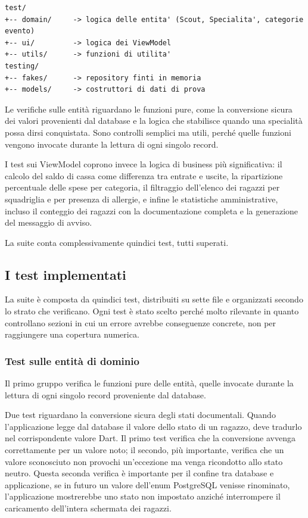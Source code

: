 \documentclass[11pt]{article}
\numberwithin{figure}{section}
\begin{document}
\begin{verbatim}
test/
+-- domain/     -> logica delle entita' (Scout, Specialita', categorie evento)
+-- ui/         -> logica dei ViewModel
+-- utils/      -> funzioni di utilita'
testing/
+-- fakes/      -> repository finti in memoria
+-- models/     -> costruttori di dati di prova
\end{verbatim}

Le verifiche sulle entità riguardano le funzioni pure, come la conversione sicura dei valori provenienti dal database e la logica che stabilisce quando una specialità possa dirsi conquistata. Sono controlli semplici ma utili, perché quelle funzioni vengono invocate durante la lettura di ogni singolo record.

I test sui ViewModel coprono invece la logica di business più significativa: il calcolo del saldo di cassa come differenza tra entrate e uscite, la ripartizione percentuale delle spese per categoria, il filtraggio dell'elenco dei ragazzi per squadriglia e per presenza di allergie, e infine le statistiche amministrative, incluso il conteggio dei ragazzi con la documentazione completa e la generazione del messaggio di avviso.

La suite conta complessivamente quindici test, tutti superati.

\subsection{I test implementati}

La suite è composta da quindici test, distribuiti su sette file e organizzati secondo lo strato che verificano. Ogni test è stato scelto perché molto rilevante in quanto controllano sezioni in cui un errore avrebbe conseguenze concrete, non per raggiungere una copertura numerica.

\subsubsection{Test sulle entità di dominio}

Il primo gruppo verifica le funzioni pure delle entità, quelle invocate durante la lettura di ogni singolo record proveniente dal database.

Due test riguardano la conversione sicura degli stati documentali. Quando l'applicazione legge dal database il valore dello stato di un ragazzo, deve tradurlo nel corrispondente valore Dart. Il primo test verifica che la conversione avvenga correttamente per un valore noto; il secondo, più importante, verifica che un valore sconosciuto non provochi un'eccezione ma venga ricondotto allo stato neutro. Questa seconda verifica è importante per il confine tra database e applicazione, se in futuro un valore dell'enum PostgreSQL venisse rinominato, l'applicazione mostrerebbe uno stato non impostato anziché interrompere il caricamento dell'intera schermata dei ragazzi.
\end{document}
